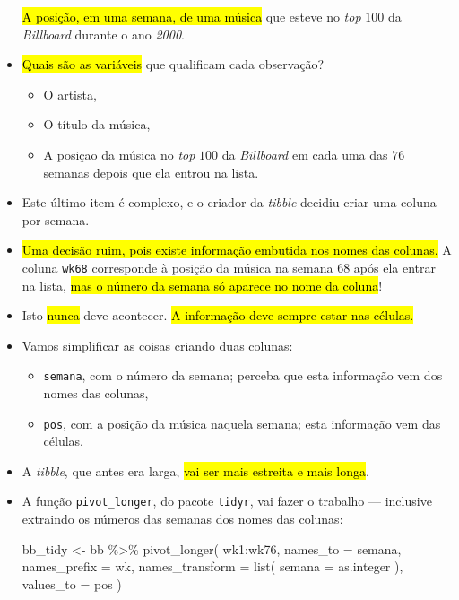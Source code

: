 \documentclass[
  11pt]{report}
\newenvironment{Shaded}{\begin{snugshade}}{\end{snugshade}}
\newcommand{\AttributeTok}[1]{\textcolor[rgb]{0.77,0.63,0.00}{#1}}
\newcommand{\FunctionTok}[1]{\textcolor[rgb]{0.00,0.00,0.00}{#1}}
\newcommand{\NormalTok}[1]{#1}
\newcommand{\OtherTok}[1]{\textcolor[rgb]{0.56,0.35,0.01}{#1}}
\newcommand{\SpecialCharTok}[1]{\textcolor[rgb]{0.00,0.00,0.00}{#1}}
\newcommand{\StringTok}[1]{\textcolor[rgb]{0.31,0.60,0.02}{#1}}
\renewenvironment{Shaded}{
    \begin{mdframed}[%
      roundcorner=2pt,%
      innerleftmargin=5pt,%
      innerrightmargin=5pt,%
      topline=true,%
      leftline=true,%
      rightline=true,%
      bottomline=true,%
      linewidth=0.5pt,%
      linecolor=black!20,%
      backgroundcolor=black!2,%
      skipabove=2ex,%
      skipbelow=2.5ex%
    ]%
  }
  {
    \end{mdframed}
  }
\begin{document}
\begin{itemize}
  {\hl{A posição, em uma semana, de uma música}} que esteve no \emph{top} $100$ da \emph{Billboard} durante o ano \emph{2000}.
\item
  {\hl{Quais são as variáveis}} que qualificam cada observação?

  \begin{itemize}
  \item
    O artista,
  \item
    O título da música,
  \item
    A posiçao da música no \emph{top} $100$ da \emph{Billboard} em cada uma das $76$ semanas depois que ela entrou na lista.
  \end{itemize}
\item
  Este último item é complexo, e o criador da \emph{tibble} decidiu criar uma coluna por semana.
\item
  {\hl{Uma decisão ruim, pois existe informação embutida nos nomes das colunas.}} A coluna \texttt{wk68} corresponde à posição da música na semana $68$ após ela entrar na lista, {\hl{mas o número da semana só aparece no nome da coluna}}!
\item
  Isto {\hl{nunca}} deve acontecer. {\hl{A informação deve sempre estar nas células.}}
\item
  Vamos simplificar as coisas criando duas colunas:

  \begin{itemize}
  \item
    \texttt{semana}, com o número da semana; perceba que esta informação vem dos nomes das colunas,
  \item
    \texttt{pos}, com a posição da música naquela semana; esta informação vem das células.
  \end{itemize}
\item
  A \emph{tibble}, que antes era larga, {\hl{vai ser mais estreita e mais longa}}.
\item
  A função \texttt{pivot\_longer}, do pacote \texttt{tidyr}, vai fazer o trabalho --- inclusive extraindo os números das semanas dos nomes das colunas:

\begin{Shaded}
\begin{Highlighting}[]
\NormalTok{bb\_tidy }\OtherTok{\textless{}{-}}\NormalTok{ bb }\SpecialCharTok{\%\textgreater{}\%} 
  \FunctionTok{pivot\_longer}\NormalTok{(}
\NormalTok{    wk1}\SpecialCharTok{:}\NormalTok{wk76,}
    \AttributeTok{names\_to =} \StringTok{\textquotesingle{}semana\textquotesingle{}}\NormalTok{,}
    \AttributeTok{names\_prefix =} \StringTok{\textquotesingle{}wk\textquotesingle{}}\NormalTok{,}
    \AttributeTok{names\_transform =} \FunctionTok{list}\NormalTok{(}
      \AttributeTok{semana =}\NormalTok{ as.integer}
\NormalTok{    ),}
    \AttributeTok{values\_to =} \StringTok{\textquotesingle{}pos\textquotesingle{}}
\NormalTok{  )}
\end{Highlighting}
\end{Shaded}


\end{itemize}
\end{document}
